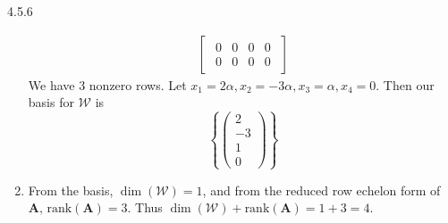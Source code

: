\documentclass{article}
\theoremstyle{definition}
\begin{document}
\begin{prob}{4.5.6}
\begin{enumerate}[label=\alph*.)]
\begin{align*}
\begin{bmatrix}
\begin{array}{rrrr}
        						0 & 0  & 0  & 0 \\
        						0 & 0  & 0  & 0
        					\end{array}
        				\end{bmatrix}
        		\end{align*}
        	We have 3 nonzero rows. Let $ x_1 = 2\alpha, x_2 = -3\alpha, x_3 = \alpha, x_4 = 0 $. Then our basis for $ \mathcal{W} $ is
        	\[
        		\left\{
        			\begin{pmatrix}
        				2 \\ -3 \\ 1 \\ 0
        			\end{pmatrix}
        		\right\}
        	\]
        	
        	\item From the basis, $ \dim(\mathcal{W}) = 1 $, and from the reduced row echelon form of $ \mathbf{A}, \, \text{rank}(\mathbf{A}) = 3 $. Thus $ \dim(\mathcal{W}) + \text{rank}(\mathbf{A}) = 1 + 3 = 4. $ 
        \end{enumerate}
    \end{prob}
	
	\newpage
	
\end{document}
